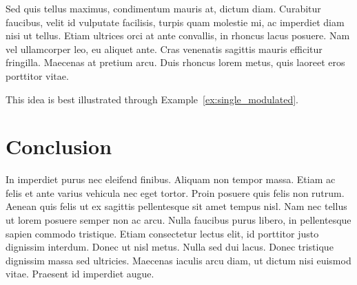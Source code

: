Sed quis tellus maximus, condimentum mauris at, dictum diam. Curabitur faucibus, velit id vulputate facilisis, turpis quam molestie mi, ac imperdiet diam nisi ut tellus. Etiam ultrices orci at ante convallis, in rhoncus lacus posuere. Nam vel ullamcorper leo, eu aliquet ante. Cras venenatis sagittis mauris efficitur fringilla. Maecenas at pretium arcu. Duis rhoncus lorem metus, quis laoreet eros porttitor vitae. \newline

This idea is best illustrated through Example~\ref{ex:single_modulated}. \newline




\section{Conclusion}
\label{sec:application_conclusion}

In imperdiet purus nec eleifend finibus. Aliquam non tempor massa. Etiam ac felis et ante varius vehicula nec eget tortor. Proin posuere quis felis non rutrum. Aenean quis felis ut ex sagittis pellentesque sit amet tempus nisl. Nam nec tellus ut lorem posuere semper non ac arcu. Nulla faucibus purus libero, in pellentesque sapien commodo tristique. Etiam consectetur lectus elit, id porttitor justo dignissim interdum. Donec ut nisl metus. Nulla sed dui lacus. Donec tristique dignissim massa sed ultricies. Maecenas iaculis arcu diam, ut dictum nisi euismod vitae. Praesent id imperdiet augue.


